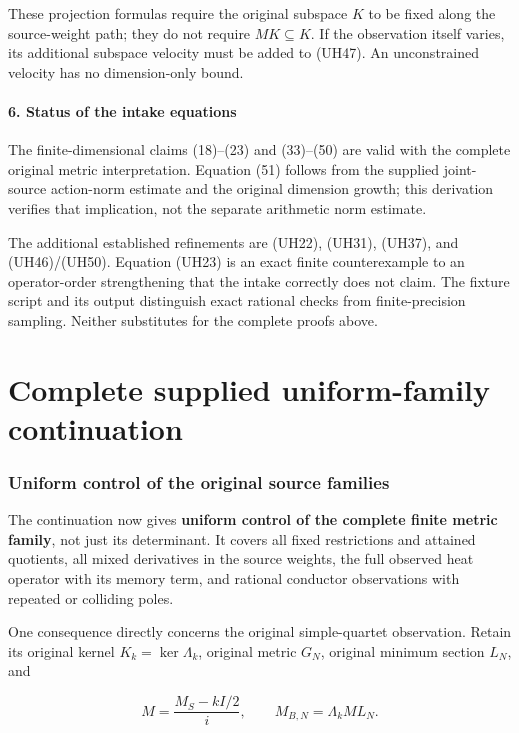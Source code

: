 \documentclass[11pt]{article}
\begin{document}
These projection formulas require the original subspace \(K\) to be fixed along the source-weight path; they do not require \(MK\subseteq K\). If the observation itself varies, its additional subspace velocity must be added to (UH47). An unconstrained velocity has no dimension-only bound.

\subsection{6. Status of the intake equations}\label{status-of-the-intake-equations}

The finite-dimensional claims (18)--(23) and (33)--(50) are valid with the complete original metric interpretation. Equation (51) follows from the supplied joint-source action-norm estimate and the original dimension growth; this derivation verifies that implication, not the separate arithmetic norm estimate.

The additional established refinements are (UH22), (UH31), (UH37), and (UH46)/(UH50). Equation (UH23) is an exact finite counterexample to an operator-order strengthening that the intake correctly does not claim. The fixture script and its output distinguish exact rational checks from finite-precision sampling. Neither substitutes for the complete proofs above.

\clearpage\part{Complete supplied uniform-family continuation}
\section{Uniform control of the original source families}\label{uniform-control-of-the-original-source-families}

The continuation now gives \textbf{uniform control of the complete finite metric family}, not just its determinant. It covers all fixed restrictions and attained quotients, all mixed derivatives in the source weights, the full observed heat operator with its memory term, and rational conductor observations with repeated or colliding poles.

One consequence directly concerns the original simple-quartet observation. Retain its original kernel \(K_k=\ker\Lambda_k\), original metric \(G_N\), original minimum section \(L_N\), and

\[
M=\frac{M_S-kI/2}{i},
\qquad
M_{B,N}=\Lambda_kML_N.
\]
\end{document}
